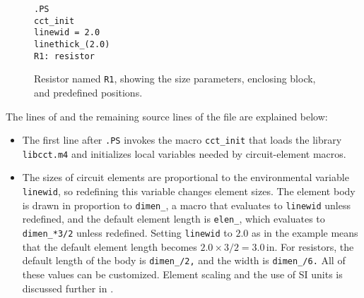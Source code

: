 \begin{figure}[H]
   \parbox{2in}{\tt .PS\\ \hbox{}\quad cct\_init\\ \hbox{}\quad linewid = 2.0\\ 
     \hbox{}\quad linethick\_(2.0)\\ R1: resistor}
   \raisebox{-0.3in}{\hbox{}}
   \caption{Resistor named {\tt R1}, showing the size parameters,
     enclosing block, and predefined positions.}
   \label{BigResistor}
   \end{figure}
The lines of 
and the remaining source lines of the file are explained below:
\begin{itemize}
\item The first line after {\tt .PS} invokes the macro {\tt cct\_init} that
   loads the library {\tt libcct.m4} 
   and initializes local variables needed by circuit-element macros.

\item
   The sizes of circuit elements are proportional to the \pic environmental
   variable {\tt linewid}, so redefining this variable changes element
   sizes.  The element body is drawn in proportion to {\tt dimen\_},
   a macro that evaluates to {\tt linewid} unless redefined, and the default
   element length is {\tt elen\_}, which evaluates to
   {\tt dimen\_*3/2} unless redefined.
   Setting {\tt linewid} to $2.0$ as in the example means that the
   default element length becomes $2.0 \times 3/2 =  3.0$\,in.
   For resistors, the default length of the body is {\tt dimen\_/2,} and the
   width is {\tt dimen\_/6.} All of these values can be customized.
   Element scaling and the use of SI units is discussed further in
   .


\end{itemize}
